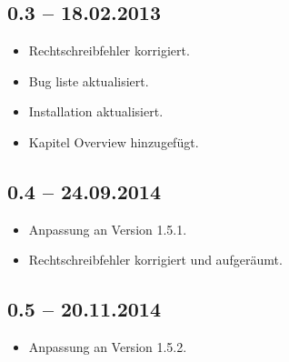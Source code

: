 \documentclass[11pt,a4paper,titlepage]{article}
\begin{document}
\subsection*{0.3 -- 18.02.2013}
\begin{itemize}
 \item Rechtschreibfehler korrigiert.
 \item Bug liste aktualisiert.
 \item Installation aktualisiert.
 \item Kapitel Overview hinzugefügt.
\end{itemize}

\subsection*{0.4 -- 24.09.2014}
\begin{itemize}
 \item Anpassung an Version 1.5.1.
 \item Rechtschreibfehler korrigiert und aufgeräumt.
\end{itemize}

\subsection*{0.5 -- 20.11.2014}
\begin{itemize}
 \item Anpassung an Version 1.5.2.
\end{itemize}

 
\end{document}
